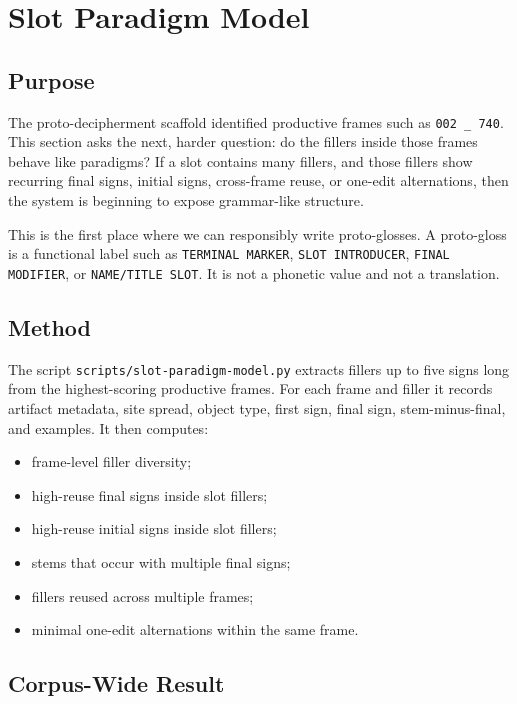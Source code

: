 \section{Slot Paradigm Model}

\subsection{Purpose}

The proto-decipherment scaffold identified productive frames such as \texttt{002 \_ 740}. This section asks the next, harder question: do the fillers inside those frames behave like paradigms? If a slot contains many fillers, and those fillers show recurring final signs, initial signs, cross-frame reuse, or one-edit alternations, then the system is beginning to expose grammar-like structure.

This is the first place where we can responsibly write proto-glosses. A proto-gloss is a functional label such as \texttt{TERMINAL MARKER}, \texttt{SLOT INTRODUCER}, \texttt{FINAL MODIFIER}, or \texttt{NAME/TITLE SLOT}. It is not a phonetic value and not a translation.

\subsection{Method}

The script \texttt{scripts/slot-paradigm-model.py} extracts fillers up to five signs long from the highest-scoring productive frames. For each frame and filler it records artifact metadata, site spread, object type, first sign, final sign, stem-minus-final, and examples. It then computes:

\begin{itemize}
  \item frame-level filler diversity;
  \item high-reuse final signs inside slot fillers;
  \item high-reuse initial signs inside slot fillers;
  \item stems that occur with multiple final signs;
  \item fillers reused across multiple frames;
  \item minimal one-edit alternations within the same frame.
\end{itemize}

\subsection{Corpus-Wide Result}

